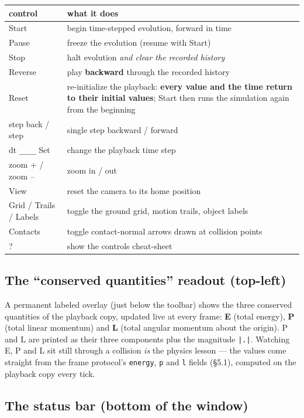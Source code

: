 \documentclass[11pt]{article}
\newcommand{\code}[1]{\texttt{#1}}
\begin{document}
\begin{center}
\begin{tabular}{lp{9.2cm}}
\textbf{control} & \textbf{what it does}\\\hline
Start & begin time-stepped evolution, forward in time\\
Pause & freeze the evolution (resume with Start)\\
Stop & halt evolution \emph{and clear the recorded history}\\
Reverse & play \textbf{backward} through the recorded history\\
Reset & re-initialize the playback: \textbf{every value and the time return to their initial values}; Start then runs the simulation again from the beginning\\
step back / step & single step backward / forward\\
dt \code{\_\_\_\_} Set & change the playback time step\\
zoom + / zoom -- & zoom in / out\\
View & reset the camera to its home position\\
Grid / Trails / Labels & toggle the ground grid, motion trails, object labels\\
Contacts & toggle contact-normal arrows drawn at collision points\\
? & show the controls cheat-sheet\\
\end{tabular}
\end{center}

\subsection{The ``conserved quantities'' readout (top-left)}

A permanent labeled overlay (just below the toolbar) shows the three
conserved quantities of the playback copy, updated live at every
frame: \textbf{E} (total energy), \textbf{P} (total linear momentum)
and \textbf{L} (total angular momentum about the origin). P and L are
printed as their three components plus the magnitude \code{|.|}.
Watching E, P and L sit still through a collision \emph{is} the
physics lesson --- the values come straight from the frame protocol's
\code{energy}, \code{p} and \code{l} fields (\S5.1), computed on the
playback copy every tick.

\subsection{The status bar (bottom of the window)}
\end{document}
